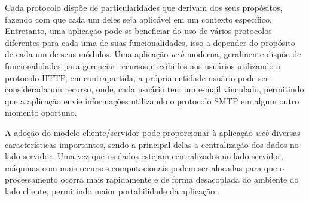 Cada protocolo dispõe de particularidades que derivam dos seus propósitos, fazendo com que cada um deles seja aplicável em um contexto específico. Entretanto, uma aplicação pode se beneficiar do uso de vários protocolos diferentes para cada uma de suas funcionalidades, isso a depender do propósito de cada um de seus módulos. Uma aplicação \textit{web} moderna, geralmente dispõe de funcionalidades para gerenciar recursos e exibi-los aos usuários utilizando o protocolo HTTP, em contrapartida, a própria entidade usuário pode ser considerada um recurso, onde, cada usuário tem um e-mail vinculado, permitindo que a aplicação envie informações utilizando o protocolo SMTP em algum outro momento oportuno.

A adoção do modelo cliente/servidor pode proporcionar à aplicação \textit{web} diversas características importantes, sendo a principal delas a centralização dos dados no lado servidor. Uma vez que os dados estejam centralizados no lado servidor, máquinas com mais recursos computacionais podem ser alocadas para que o processamento ocorra mais rapidamente e de forma desacoplada do ambiente do lado cliente, permitindo maior portabilidade da aplicação \cite{oluwatosin2014client}.






